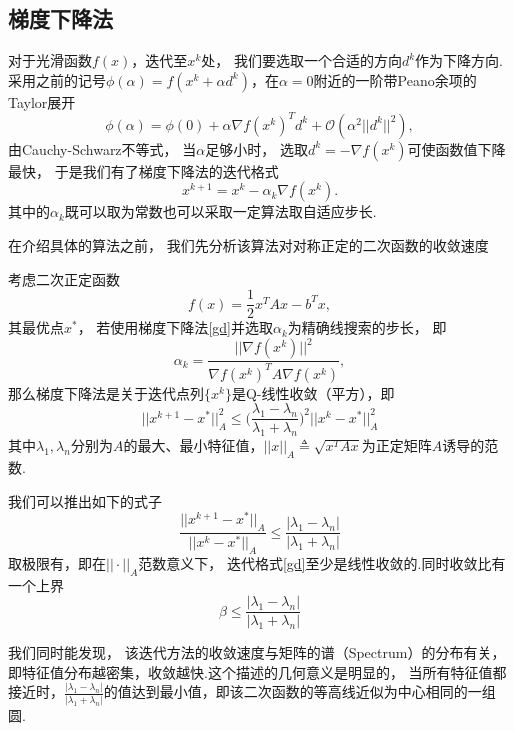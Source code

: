 \subsection{梯度下降法}
对于光滑函数$f(x)$，迭代至$x^k$处， 我们要选取一个合适的方向$d^k$作为下降方向.采用之前的记号$\phi(\alpha) = f(x^k +\alpha d^k)$，在$\alpha = 0$附近的一阶带Peano余项的Taylor展开
\begin{equation*}
	\phi(\alpha) = \phi(0) + \alpha \nabla f(x^k)^Td^k + \mathcal{O}(\alpha^2||d^k||^2),
\end{equation*}
由Cauchy-Schwarz不等式， 当$\alpha$足够小时， 选取$d^k = -\nabla f(x^k)$可使函数值下降最快， 于是我们有了梯度下降法的迭代格式
\begin{equation}\label{gd}
	x^{k+1}  = x^k - \alpha_k \nabla f(x^k).
\end{equation}
其中的$\alpha_k$既可以取为常数也可以采取一定算法取自适应步长.\par
在介绍具体的算法之前， 我们先分析该算法对对称正定的二次函数的收敛速度
\begin{theorem}
	考虑二次正定函数
	\begin{equation*}
		f(x) = \frac{1}{2}x^TAx - b^Tx,
	\end{equation*}
	其最优点$x^*$， 若使用梯度下降法\eqref{gd}并选取$\alpha_k$为精确线搜索的步长， 即
	\begin{equation*}
		\alpha_k = \frac{||\nabla f(x^k)||^2}{\nabla f(x^k)^T A \nabla f(x^k)},
	\end{equation*}
	那么梯度下降法是关于迭代点列$\{x^k\}$是Q-线性收敛（平方），即
	\begin{equation*}
		||x^{k+1}-x^*||_A^2 \leq \Big( \frac{\lambda_1-\lambda_n}{\lambda_1+\lambda_n}\Big)^2 ||x^{k}-x^*||_A^2
	\end{equation*}
	其中$\lambda_1,\lambda_n$分别为$A$的最大、最小特征值，$||x||_A\triangleq \sqrt{x^TAx}$为正定矩阵$A$诱导的范数.
\end{theorem}
\begin{note}
	我们可以推出如下的式子
	\begin{equation*}
		\frac{||x^{k+1}-x^*||_A}{||x^{k}-x^*||_A}\leq  \frac{|\lambda_1-\lambda_n|}{|\lambda_1+\lambda_n|}
	\end{equation*}
	取极限有，即在$||\cdot||_A$范数意义下， 迭代格式\eqref{gd}至少是线性收敛的.同时收敛比有一个上界
	\begin{equation*}
		\beta \leq \frac{|\lambda_1-\lambda_n|}{|\lambda_1+\lambda_n|}
	\end{equation*}
\end{note}
\begin{note}
	我们同时能发现， 该迭代方法的收敛速度与矩阵的谱（Spectrum）的分布有关，即特征值分布越密集，收敛越快.这个描述的几何意义是明显的， 当所有特征值都接近时，$\frac{|\lambda_1-\lambda_n|}{|\lambda_1+\lambda_n|}$的值达到最小值，即该二次函数的等高线近似为中心相同的一组圆. 
\end{note}
